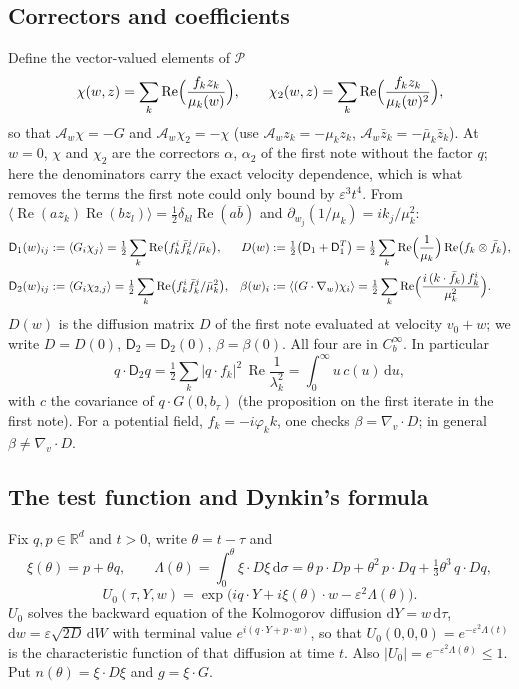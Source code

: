 \documentclass[11pt]{article}
\newcommand{\dd}{\mathrm{d}}
\newcommand{\eps}{\varepsilon}
\newcommand{\cA}{\mathcal{A}}
\newcommand{\cP}{\mathcal{P}}
\newcommand{\sD}{\mathsf{D}}
\renewcommand{\Re}{\operatorname{Re}}
\newcommand{\avg}[1]{\langle #1\rangle}
\theoremstyle{remark}
\begin{document}
\subsection{Correctors and coefficients}

Define the vector-valued elements of $\cP$
\[
  \chi(w,z) = \sum_k\Re\Bigl(\frac{f_kz_k}{\mu_k(w)}\Bigr),\qquad
  \chi_2(w,z) = \sum_k\Re\Bigl(\frac{f_kz_k}{\mu_k(w)^2}\Bigr),
\]
so that $\cA_w\chi = -G$ and $\cA_w\chi_2 = -\chi$ (use
$\cA_wz_k = -\mu_kz_k$, $\cA_w\bar z_k = -\bar\mu_k\bar z_k$). At $w=0$,
$\chi$ and $\chi_2$ are the correctors $\alpha$, $\alpha_2$ of the first note
without the factor $q$; here the denominators carry the exact velocity
dependence, which is what removes the terms the first note could only bound
by $\eps^3t^4$. From
$\avg{\Re(az_k)\Re(bz_l)} = \tfrac12\delta_{kl}\Re(a\bar b)$ and
$\partial_{w_j}(1/\mu_k) = ik_j/\mu_k^2$:
\begin{align}
  \sD_1(w)_{ij} &:= \avg{G_i\chi_j}
     = \tfrac12\sum_k\Re\bigl(f_k^i\bar f_k^j/\bar\mu_k\bigr), &
  D(w) &:= \tfrac12\bigl(\sD_1 + \sD_1^{T}\bigr)
     = \tfrac12\sum_k\Re\Bigl(\frac1{\mu_k}\Bigr)\Re\bigl(f_k\otimes\bar f_k\bigr),
     \notag\\
  \sD_2(w)_{ij} &:= \avg{G_i\chi_{2,j}}
     = \tfrac12\sum_k\Re\bigl(f_k^i\bar f_k^j/\bar\mu_k^2\bigr), &
  \beta(w)_i &:= \avg{(G\cdot\nabla_w)\chi_i}
     = \tfrac12\sum_k\Re\Bigl(\frac{i\,(k\cdot\bar f_k)\,f_k^i}{\mu_k^2}\Bigr).
  \label{eq:coef}
\end{align}
$D(w)$ is the diffusion matrix $D$ of the first note evaluated at
velocity $v_0+w$; we write $D = D(0)$, $\sD_2 = \sD_2(0)$, $\beta = \beta(0)$.
All four are in $C_b^\infty$. In particular
\[
  q\cdot\sD_2q = \tfrac12\sum_k|q\cdot f_k|^2\,\Re\frac{1}{\lambda_k^2}
  = \int_0^\infty u\,c(u)\,\dd u,
\]
with $c$ the covariance of $q\cdot G(0,b_\tau)$ (the proposition on the first iterate in the first
note). For a potential field, $f_k = -i\varphi_kk$, one checks
$\beta = \nabla_v\cdot D$; in general $\beta\ne\nabla_v\cdot D$.

\subsection{The test function and Dynkin's formula}

Fix $q,p\in\mathbb{R}^d$ and $t>0$, write $\theta = t-\tau$ and
\begin{equation}
  \xi(\theta) = p + \theta q,\qquad
  \Lambda(\theta) = \int_0^\theta\xi\cdot D\xi\,\dd\sigma
   = \theta\,p\cdot Dp + \theta^2\,p\cdot Dq + \tfrac13\theta^3\,q\cdot Dq,
\end{equation}
\begin{equation}
  U_0(\tau,Y,w) = \exp\bigl(iq\cdot Y + i\xi(\theta)\cdot w
     - \eps^2\Lambda(\theta)\bigr).
\end{equation}
$U_0$ solves the backward equation of the Kolmogorov diffusion
$\dd Y = w\,\dd\tau$, $\dd w = \eps\sqrt{2D}\,\dd W$ with terminal value
$e^{i(q\cdot Y+p\cdot w)}$, so that $U_0(0,0,0) = e^{-\eps^2\Lambda(t)}$ is the
characteristic function of that diffusion at time $t$. Also
$|U_0| = e^{-\eps^2\Lambda(\theta)}\le1$. Put $n(\theta) = \xi\cdot D\xi$ and
$g = \xi\cdot G$.
\end{document}
